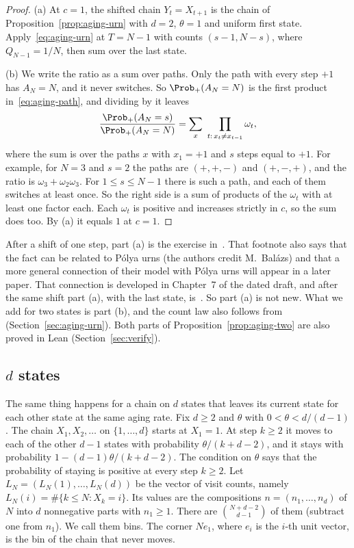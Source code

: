\begin{proof}
(a) At $c=1$, the shifted chain $Y_t=X_{t+1}$ is the chain of
Proposition~\ref{prop:aging-urn} with $d=2$, $\theta=1$ and uniform first
state. Apply~\eqref{eq:aging-urn} at $T=N-1$ with counts $(s-1,N-s)$,
where $Q_{N-1}=1/N$, then sum over the last state.

(b) We write the ratio as a sum over paths. Only the path with every step
$+1$ has $A_N=N$, and it never switches. So $\Prob_+(A_N=N)$ is the first
product in~\eqref{eq:aging-path}, and dividing by it leaves
\begin{equation}\label{eq:aging-ratio}
 \frac{\Prob_+(A_N=s)}{\Prob_+(A_N=N)}
 =\sum_{x}\ \prod_{t:\,x_t\ne x_{t-1}}\omega_t ,
\end{equation}
where the sum is over the paths $x$ with $x_1=+1$ and $s$ steps equal to
$+1$. For example, for $N=3$ and $s=2$ the paths are $(+,+,-)$ and $(+,-,+)$,
and the ratio is $\omega_3+\omega_2\omega_3$. For $1\le s\le N-1$ there is
such a path, and each of them switches at least once. So the right side is a
sum of products of the $\omega_t$ with at least one factor each. Each
$\omega_t$ is positive and increases strictly in $c$, so the sum does too. By
(a) it equals $1$ at $c=1$.
\end{proof}

After a shift of one step, part (a) is the exercise
in~\cite[Section~3.1, footnote~1]{evw2020}. That footnote also says that the fact
can be related to P\'olya urns (the authors credit M.~Bal\'azs) and that a
more general connection of their model with P\'olya urns will appear in a
later paper.
That connection is developed in Chapter~7 of the dated draft, and after the same
shift part (a), with the last state, is~. So part (a)
is not new. What we add for
two states is part (b), and the count law also follows
from~\cite[Theorem~2.18]{dls2023} (Section~\ref{sec:aging-urn}). Both parts of
Proposition~\ref{prop:aging-two} are also proved in Lean
(Section~\ref{sec:verify}).

\subsection{\texorpdfstring{$d$}{d} states}

The same thing happens for a chain on $d$ states that leaves its current
state for each other state at the same aging rate. Fix $d\ge2$ and $\theta$
with $0<\theta<d/(d-1)$. The chain $X_1,X_2,\dots$ on $\{1,\dots,d\}$ starts at
$X_1=1$. At step $k\ge2$ it moves to each of the other $d-1$ states with
probability $\theta/(k+d-2)$, and it stays with probability
$1-(d-1)\theta/(k+d-2)$. The condition on $\theta$ says that the probability
of staying is positive at every step $k\ge2$. Let
$L_N=(L_N(1),\dots,L_N(d))$ be the vector of visit counts, namely
$L_N(i)=\#\{k\le N:X_k=i\}$. Its values are the compositions
$n=(n_1,\dots,n_d)$ of $N$ into $d$ nonnegative parts with $n_1\ge1$. There
are $\binom{N+d-2}{d-1}$ of them (subtract one from $n_1$). We call them
bins. The corner $Ne_1$, where $e_i$ is the $i$-th unit vector, is the bin of
the chain that never moves.

